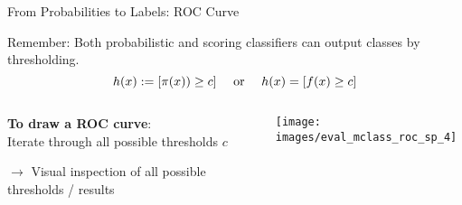 \documentclass[11pt,compress,t,notes=noshow, xcolor=table]{beamer}
\newenvironment{knitrout}{}{} %
\begin{document}

\begin{vbframe}{From Probabilities to Labels: ROC Curve}

Remember: Both probabilistic and scoring classifiers can output classes by thresholding.\\
$$h(x):= [\pi(x)) \ge c] \quad \text{ or } \quad h(x) = [f(x) \ge c]$$

\begin{columns}
\begin{column}{0.45\textwidth}

\textbf{To draw a ROC curve}:\\

Iterate through all possible thresholds $c$

\lz 


$\rightarrow$ Visual inspection of all possible thresholds / results

\end{column}
\begin{column}{0.45\textwidth} 

\begin{knitrout}\scriptsize
{}\color{fgcolor}

{\centering \texttt{[image: images/eval\_mclass\_roc\_sp\_4]}

}



\end{knitrout}


\end{column}
\end{columns}

\end{vbframe}
\end{document}
